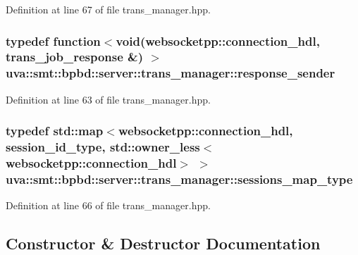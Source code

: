 Definition at line 67 of file trans\+\_\+manager.\+hpp.

\hypertarget{classuva_1_1smt_1_1bpbd_1_1server_1_1trans__manager_ac7a3a0d2d4e7d21b2ce55161bf84f53e}{}
\subsubsection[{response\+\_\+sender}]{\setlength{\rightskip}{0pt plus 5cm}typedef function$<$void(websocketpp\+::connection\+\_\+hdl, {\bf trans\+\_\+job\+\_\+response} \&) $>$ {\bf uva\+::smt\+::bpbd\+::server\+::trans\+\_\+manager\+::response\+\_\+sender}}\label{classuva_1_1smt_1_1bpbd_1_1server_1_1trans__manager_ac7a3a0d2d4e7d21b2ce55161bf84f53e}


Definition at line 63 of file trans\+\_\+manager.\+hpp.

\hypertarget{classuva_1_1smt_1_1bpbd_1_1server_1_1trans__manager_aea69500c7a8a6bcb5b2035a684537bcb}{}
\subsubsection[{sessions\+\_\+map\+\_\+type}]{\setlength{\rightskip}{0pt plus 5cm}typedef std\+::map$<$websocketpp\+::connection\+\_\+hdl, {\bf session\+\_\+id\+\_\+type}, std\+::owner\+\_\+less$<$websocketpp\+::connection\+\_\+hdl$>$ $>$ {\bf uva\+::smt\+::bpbd\+::server\+::trans\+\_\+manager\+::sessions\+\_\+map\+\_\+type}}\label{classuva_1_1smt_1_1bpbd_1_1server_1_1trans__manager_aea69500c7a8a6bcb5b2035a684537bcb}


Definition at line 66 of file trans\+\_\+manager.\+hpp.



\subsection{Constructor \& Destructor Documentation}
\hypertarget{classuva_1_1smt_1_1bpbd_1_1server_1_1trans__manager_a053a8f5be8b004358e5e20b3a1810efb}{}
